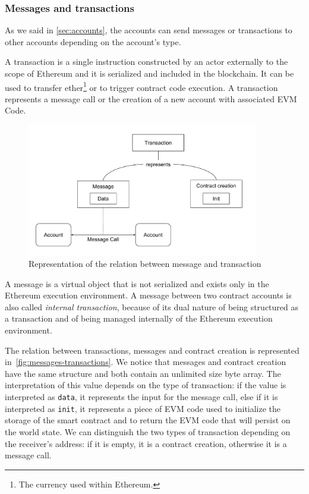 \subsubsection{Messages and transactions}

As we said in \autoref{sec:accounts}, the accounts can send messages or
transactions to other accounts depending on the account's type.

A transaction is a single instruction constructed by an actor externally to the
scope of Ethereum \cite{wood2018ethereum} and it is serialized and included in
the blockchain. It can be used to transfer ether\footnote{The currency used
within Ethereum.} or to trigger contract code execution. A transaction
represents a message call or the creation of a new account with associated EVM
Code.

\begin{figure}[h]
  \centering
  \includegraphics[width=0.9\textwidth]{./res/img/messages-transactions.pdf}
  \caption{Representation of the relation between message and transaction}
  \label{fig:messages-transactions}
\end{figure}

A message is a virtual object that is not serialized and exists only in the
Ethereum execution environment. A message between two contract accounts is also
called \emph{internal transaction}, because of its dual nature of being
structured as a transaction and of being managed internally of the Ethereum
execution environment.

The relation between transactions, messages and contract creation is represented
in~\autoref{fig:messages-transactions}. We notice that messages and contract
creation have the same structure and both contain an unlimited size byte array.
The interpretation of this value depends on the type of transaction: if the
value is interpreted as \verb+data+, it represents the input for the message
call, else if it is interpreted as \verb|init|, it represents a piece of EVM
code used to initialize the storage of the smart contract and to return the EVM
code that will persist on the world state. We can distinguish the two types of
transaction depending on the receiver's address: if it is empty, it is a
contract creation, otherwise it is a message call.

